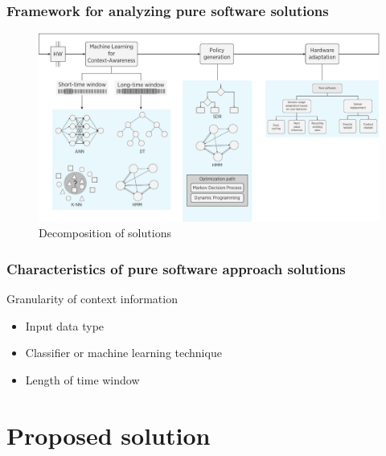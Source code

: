 \documentclass[compress,9pt,xcolor={dvipsnames,table}]{beamer}
\begin{document}
\begin{frame}[t]\frametitle{Framework for analyzing pure software solutions}
\begin{figure}[tb]
  \centering
  \includegraphics[width=\textwidth]{../../../resources/images/vectors/dual-taxonomy}
  \caption{Decomposition of solutions}
  \label{fig:dual-taxonomy}
  \end{figure}
\end{frame}

\begin{frame}[t]\frametitle{Characteristics of pure software approach solutions}
\begin{tcolorbox}[title=Framework for analyzing solutions,colframe=PineGreen]
\small
Granularity of context information
\begin{itemize}
  \item Input data type
  \item Classifier or machine learning technique
  \item Length of time window
\end{itemize}
\end{tcolorbox}
\end{frame}

\section{Proposed solution}
\end{document}
